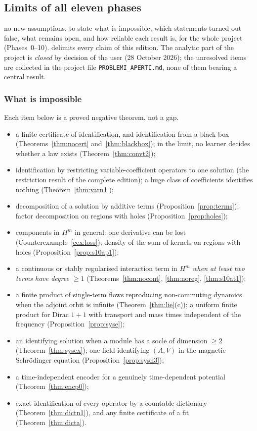 \subsection{Limits of all eleven phases}\label{ch:status}
\sectionbrief
{no new assumptions.}
{to state what is impossible, which statements turned out false, what remains open, and how reliable each result is, for the whole project (Phases~0--10).}
{delimits every claim of this edition. The analytic part of the project is \emph{closed} by decision of the user (28 October 2026); the unresolved items are collected in the project file \texttt{PROBLEMI\_APERTI.md}, none of them bearing a central result.}

\subsubsection{What is impossible}

Each item below is a proved negative theorem, not a gap.
\begin{itemize}
\item a finite certificate of identification, and identification from a black box (Theorems~\ref{thm:nocert} and~\ref{thm:blackbox}); in the limit, no learner decides whether a law exists (Theorem~\ref{thm:convt2});
\item identification by restricting variable-coefficient operators to one solution (the restriction result of the complete edition); a huge class of coefficients identifies nothing (Theorem~\ref{thm:varn1});
\item decomposition of a solution by additive terms (Proposition~\ref{prop:terms}); factor decomposition on regions with holes (Proposition~\ref{prop:holes});
\item components in $H^m$ in general: one derivative can be lost (Counterexample~\ref{cex:loss}); density of the sum of kernels on regions with holes (Proposition~\ref{prop:s10ap1});
\item a continuous or stably regularised interaction term in $H^m$ \emph{when at least two terms have degree $\ge1$} (Theorems~\ref{thm:nocont}, \ref{thm:noreg}, \ref{thm:s10at1});
\item a finite product of single-term flows reproducing non-commuting dynamics when the adjoint orbit is infinite (Theorem~\ref{thm:lie}(c)); a uniform finite product for Dirac $1+1$ with transport and mass times independent of the frequency (Proposition~\ref{prop:syse});
\item an identifying solution when a module has a socle of dimension $\ge2$ (Theorem~\ref{thm:sysex}); one field identifying $(A,V)$ in the magnetic Schr\"odinger equation (Proposition~\ref{prop:sysn3});
\item a time-independent encoder for a genuinely time-dependent potential (Theorem~\ref{thm:encp0});
\item exact identification of every operator by a countable dictionary (Theorem~\ref{thm:dictn1}), and any finite certificate of a fit (Theorem~\ref{thm:dicta}).
\end{itemize}

